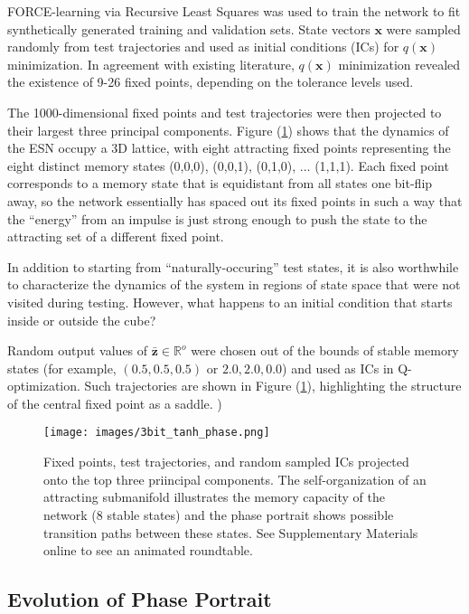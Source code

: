 \documentclass{article} %
\newcommand{\bf}[1]{\mathbf{#1}}
\newcommand{\x}{\bf{x}}
\begin{document}
FORCE-learning via Recursive Least Squares was used to train the network to fit synthetically generated training and validation sets. State vectors $\x$ were sampled randomly from test trajectories and used as initial conditions (ICs) for $q(\x)$ minimization. In agreement with existing literature, $q(\x)$ minimization revealed the existence of 9-26 fixed points, depending on the tolerance levels used.

The 1000-dimensional fixed points and test trajectories were then projected to their largest three principal components. Figure (\ref{fig:3bit_phase}) shows that the dynamics of the ESN occupy a 3D lattice, with eight attracting fixed points representing the eight distinct memory states (0,0,0), (0,0,1), (0,1,0), ... (1,1,1). Each fixed point corresponds to a memory state that is equidistant from all states one bit-flip away, so the network essentially has spaced out its fixed points in such a way that the ``energy'' from an impulse is just strong enough to push the state to the attracting set of a different fixed point.

In addition to starting from ``naturally-occuring'' test states, it is also worthwhile to characterize the dynamics of the system in regions of state space that were not visited during testing. However, what happens to an initial condition that starts inside or outside the cube?

Random output values of $\bar{\bf{z}} \in \mathbb{R}^o$ were chosen out of the bounds of stable memory states (for example, $(0.5,0.5,0.5)$ or $2.0,2.0,0.0$) and used as ICs in Q-optimization. Such trajectories are shown in Figure (\ref{fig:3bit_phase}), highlighting the structure of the central fixed point as a saddle.
)

\begin{figure}
\centering
\texttt{[image: images/3bit\_tanh\_phase.png]}
\caption{Fixed points, test trajectories, and random sampled ICs projected onto the top three priincipal components. The self-organization of an attracting submanifold illustrates the memory capacity of the network (8 stable states) and the phase portrait shows possible transition paths between these states. See Supplementary Materials online to see an animated roundtable.}
\label{fig:3bit_phase}
\end{figure}

\subsection{Evolution of Phase Portrait}
\end{document}
